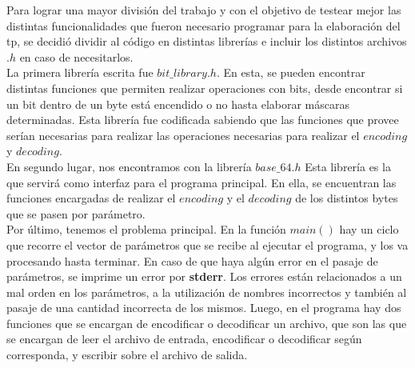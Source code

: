 \documentclass[11pt]{article}
\begin{document}
        Para lograr una mayor división del trabajo y con el objetivo de testear mejor las distintas funcionalidades que fueron necesario programar para la elaboración del tp, se decidió dividir al código en distintas librerías e incluir los distintos archivos $.h$ en caso de necesitarlos.\\
        La primera librería escrita fue $bit\_library.h$. En esta, se pueden encontrar distintas funciones que permiten realizar operaciones con bits, desde encontrar si un bit dentro de un byte está encendido o no hasta elaborar máscaras determinadas. Esta librería fue codificada sabiendo que las funciones que provee serían necesarias para realizar las operaciones necesarias para realizar el $encoding$ y $decoding$. \\
        En segundo lugar, nos encontramos con la librería $base\_64.h$ Esta librería es la que servirá como interfaz para el programa principal. En ella, se encuentran las funciones encargadas de realizar el $encoding$ y el $decoding$ de los distintos bytes que se pasen por parámetro. \\
        Por último, tenemos el problema principal. En la función $main()$ hay un ciclo que recorre el vector de parámetros que se recibe al ejecutar el programa, y los va procesando hasta terminar. En caso de que haya algún error en el pasaje de parámetros, se imprime un error por \textbf{stderr}. Los errores están relacionados a un mal orden en los parámetros, a la utilización de nombres incorrectos y también al pasaje de una cantidad incorrecta de los mismos. Luego, en el programa hay dos funciones que se encargan de encodificar o decodificar un archivo, que son las que se encargan de leer el archivo de entrada, encodificar o decodificar según corresponda, y escribir sobre el archivo de salida.
\end{document}
